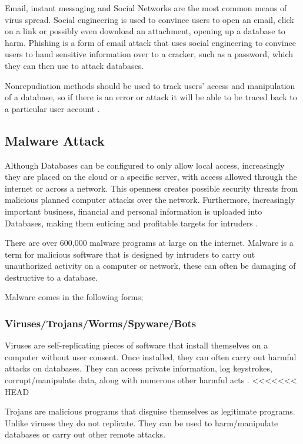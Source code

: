 \documentclass[11pt, twocolumn]{article}
\begin{document}
Email, instant messaging and Social Networks are the most common means of virus spread.  Social engineering is used to convince users to open an email, click on a link or possibly even download an attachment, opening up a database to harm.  Phishing is a form of email attack that uses social engineering to convince users to hand sensitive information over to a cracker, such as a password, which they can then use to attack databases\cite{Bas}.

Nonrepudiation methods should be used to track users’ access and manipulation of a database, so if there is an error or attack it will be able to be traced back to a particular user account \cite{Thur}.

\subsection{Malware Attack}

Although Databases can be configured to only allow local access, increasingly they are placed on the cloud or a specific server, with access allowed through the internet or across a network.  This openness creates possible security threats from malicious planned computer attacks over the network.  Furthermore, increasingly important business, financial and personal information is uploaded into Databases, making them enticing and profitable targets for intruders \cite{Bas}.

There are over 600,000 malware programs at large on the internet.  Malware is a term for malicious software that is designed by intruders to carry out unauthorized activity on a computer or network, these can often be damaging of destructive to a database\cite{Bas}.

Malware comes in the following forms;

\subsubsection{Viruses/Trojans/Worms/Spyware/Bots}
Viruses are self-replicating pieces of software that install themselves on a computer without user consent.  Once installed, they can often carry out harmful attacks on databases.  They can access private information, log keystrokes, corrupt/manipulate data, along with numerous other harmful acts \cite{Bas}.
<<<<<<< HEAD

Trojans are malicious programs that disguise themselves as legitimate programs.  Unlike viruses they do not replicate.  They can be used to harm/manipulate databases or carry out other remote attacks\cite{Bas}.
\end{document}
